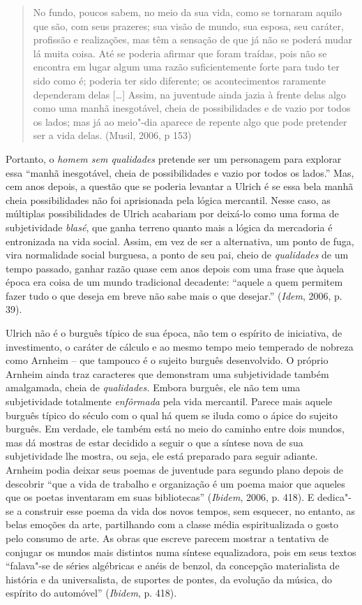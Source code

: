 \begin{quote}
No fundo, poucos sabem, no meio da sua vida, como se tornaram aquilo que
são, com seus prazeres; sua visão de mundo, sua esposa, seu caráter,
profissão e realizações, mas têm a sensação de que já não se poderá
mudar lá muita coisa. Até se poderia afirmar que foram traídas, pois não
se encontra em lugar algum uma razão suficientemente forte para tudo ter
sido como é; poderia ter sido diferente; os acontecimentos raramente
dependeram delas [\ldots{}] Assim, na juventude ainda jazia à frente
delas algo como uma manhã inesgotável, cheia de possibilidades e de
vazio por todos os lados; mas já ao meio"-dia aparece de repente algo que
pode pretender ser a vida delas. (Musil, 2006, p 153)
\end{quote}

Portanto, o \emph{homem sem qualidades} pretende ser um personagem para
explorar essa ``manhã inesgotável, cheia de possibilidades e vazio por
todos os lados.'' Mas, cem anos depois, a questão que se poderia
levantar a Ulrich é se essa bela manhã cheia possibilidades não foi
aprisionada pela lógica mercantil. Nesse caso, as múltiplas
possibilidades de Ulrich acabariam por deixá-lo como uma forma de
subjetividade \emph{blasé}, que ganha terreno quanto mais a lógica da
mercadoria é entronizada na vida social. Assim, em vez de ser a
alternativa, um ponto de fuga, vira normalidade social burguesa, a ponto
de seu pai, cheio de \emph{qualidades} de um tempo passado, ganhar razão
quase cem anos depois com uma frase que àquela época era coisa de um
mundo tradicional decadente: ``aquele a quem permitem fazer tudo o que
deseja em breve não sabe mais o que desejar.'' (\emph{Idem}, 2006, p. 39).

Ulrich não é o burguês típico de sua época, não tem o espírito de
iniciativa, de investimento, o caráter de cálculo e ao mesmo tempo meio
temperado de nobreza como Arnheim -- que tampouco é o sujeito burguês
desenvolvido. O próprio Arnheim ainda traz caracteres que demonstram uma
subjetividade também amalgamada, cheia de \emph{qualidades.} Embora
burguês, ele não tem uma subjetividade totalmente \emph{enfôrmada} pela
vida mercantil. Parece mais aquele burguês típico do século  com o
qual há quem se iluda como o ápice do sujeito burguês. Em verdade, ele
também está no meio do caminho entre dois mundos, mas dá mostras de
estar decidido a seguir o que a síntese nova de sua subjetividade lhe
mostra, ou seja, ele está preparado para seguir adiante. Arnheim podia
deixar seus poemas de juventude para segundo plano depois de descobrir
``que a vida de trabalho e organização é um poema maior que aqueles que
os poetas inventaram em suas bibliotecas'' (\emph{Ibidem}, 2006, p. 418). E
dedica"-se a construir esse poema da vida dos novos tempos, sem esquecer,
no entanto, as belas emoções da arte, partilhando com a classe média
espiritualizada o gosto pelo consumo de arte. As obras que escreve
parecem mostrar a tentativa de conjugar os mundos mais distintos numa
síntese equalizadora, pois em seus textos ``falava"-se de séries
algébricas e anéis de benzol, da concepção materialista de história e da
universalista, de suportes de pontes, da evolução da música, do espírito
do automóvel'' (\emph{Ibidem}, p. 418).

